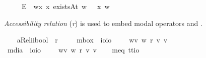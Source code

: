 \begin{isabellebody}
\ \ \ \ \ {\isachardoublequoteopen}\isactrlbold {\isasymexists}\isactrlsup E{\isasymPhi}\ {\isasymequiv}\ {\isasymlambda}w{\isachardot}{\isasymexists}x{\isachardot}\ {\isacharparenleft}x\ existsAt\ w{\isacharparenright}\ {\isasymand}\ {\isacharparenleft}{\isasymPhi}\ x\ w{\isacharparenright}{\isachardoublequoteclose}%
\begin{isamarkuptext}%
\emph{Accessibility relation} (\emph{r}) is used to embed modal operators \isa{{\isasymbox}} and \isa{{\isasymdiamond}}.%
\end{isamarkuptext}\isamarkuptrue%
\ \ \isamarkupfalse%
\ aRel{\isacharcolon}{\isacharcolon}{\isachardoublequoteopen}i{\isasymRightarrow}i{\isasymRightarrow}bool{\isachardoublequoteclose}\ {\isacharparenleft}\ {\isachardoublequoteopen}r{\isachardoublequoteclose}\ {}{}{\isacharparenright}\isanewline
\ \ \isamarkupfalse%
\ mbox\ {\isacharcolon}{\isacharcolon}\ {\isachardoublequoteopen}io{\isasymRightarrow}io{\isachardoublequoteclose}\ {\isacharparenleft}{\isachardoublequoteopen}\ \ {\isachardoublequoteopen}\isactrlbold {\isasymbox}{\isasymphi}\ {\isasymequiv}\ {\isasymlambda}w{\isachardot}{\isasymforall}v{\isachardot}\ {\isacharparenleft}w\ r\ v{\isacharparenright}{\isasymlongrightarrow}{\isacharparenleft}{\isasymphi}\ v{\isacharparenright}{\isachardoublequoteclose}\isanewline
\ \ \isamarkupfalse%
\ mdia\ {\isacharcolon}{\isacharcolon}\ {\isachardoublequoteopen}io{\isasymRightarrow}io{\isachardoublequoteclose}\ {\isacharparenleft}{\isachardoublequoteopen}\ \ {\isachardoublequoteopen}\isactrlbold {\isasymdiamond}{\isasymphi}\ {\isasymequiv}\ {\isasymlambda}w{\isachardot}{\isasymexists}v{\isachardot}\ {\isacharparenleft}w\ r\ v{\isacharparenright}{\isasymand}{\isacharparenleft}{\isasymphi}\ v{\isacharparenright}{\isachardoublequoteclose}\isanewline
\ \ \isanewline
{}\isamarkupfalse%
\ meq{\isacharcolon}{\isacharcolon}\ {\isachardoublequoteopen}{\isacharprime}t{\isasymRightarrow}{\isacharprime}t{\isasymRightarrow}io{\isachardoublequoteclose}\ {\isacharparenleft}\ %

\end{isabellebody}
